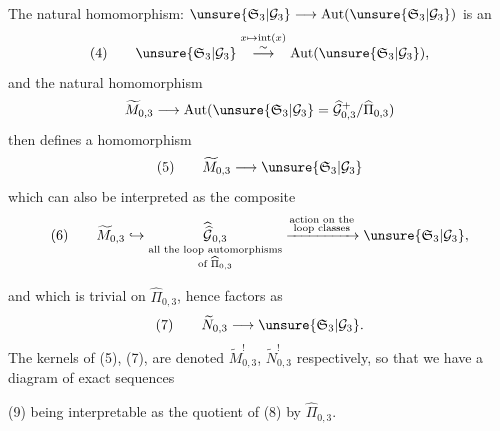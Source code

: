 The natural homomorphism: $\unsure{\mathfrak S_3|\mathcal G_3}\longrightarrow\operatorname{Aut}(\unsure{\mathfrak S_3|\mathcal G_3})$ is an 
\[
(4)\qquad\unsure{\mathfrak S_3|\mathcal G_3}\overset{x\mapsto\operatorname{int}(x)}{\overset{\sim}{\longrightarrow}}\operatorname{Aut}(\unsure{\mathfrak S_3|\mathcal G_3}),
\]
and the natural homomorphism
\[
\widetilde M_{0,3}\longrightarrow\operatorname{Aut}(\unsure{\mathfrak S_3|\mathcal G_3}=\widehat{\mathcal G}_{0,3}^{+}/\widehat{\Pi}_{0,3})
\]
then defines a homomorphism
\[
(5)\qquad\widetilde M_{0,3}\longrightarrow\unsure{\mathfrak S_3|\mathcal G_3}
\]
which can also be interpreted as the composite
\[
(6)\qquad\widetilde M_{0,3}\hookrightarrow
\underset{\substack{\text{all the loop automorphisms}\\\text{of }\widehat{\Pi}_{0,3}}}{\widehat{\widehat{\mathcal G}}_{0,3}}
\xrightarrow{\substack{\text{action on the}\\\text{loop classes}}}
\unsure{\mathfrak S_3|\mathcal G_3},
\]


and which is trivial on $\widehat{\Pi}_{0,3}$, hence factors as
\[
(7)\qquad\widetilde N_{0,3}\longrightarrow\unsure{\mathfrak S_3|\mathcal G_3}.
\]
The kernels of (5), (7), are denoted $\widetilde M_{0,3}^{!}$, $\widetilde N_{0,3}^{!}$ respectively, so that we have a diagram of exact sequences


(9) being interpretable as the quotient of (8) by $\widehat{\Pi}_{0,3}$.


